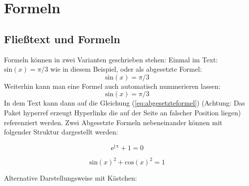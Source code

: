 
\chapter{Formeln}

\section{Fließtext und Formeln}

\label{eq:formelnnummeriert}Formeln können in zwei Varianten geschrieben
stehen: Einmal im Text: $\mathrm{sin}(x)=\pi/3$ wie in diesem Beispiel,
oder als abgesetzte Formel: 
\[
\mathrm{sin}(x)=\pi/3
\]
Weiterhin kann man eine Formel auch automatisch nummerieren lassen:
\begin{equation}
\mathrm{sin}(x)=\pi/3\label{eq:abgesetzteformel}
\end{equation}
In dem Text kann dann auf die Gleichung (\ref{eq:abgesetzteformel})
(Achtung: Das Paket hyperref erzeugt Hyperlinks die auf der Seite
an falscher Position liegen) referenziert werden. Zwei Abgesetzte
Formeln nebeneinander können mit folgender Struktur dargestellt werden:

\begin{minipage}[t]{0.39\textwidth}%
\begin{equation}
\mathrm{e}^{\mathrm{j\,\pi}}+1=0\label{eq:allekonstentenineinergleichung}
\end{equation}
%
\end{minipage} %
\begin{minipage}[t]{0.59\textwidth}%
\begin{equation}
\mathrm{sin}(x)^{2}+\mathrm{cos}(x)^{2}=1\label{eq:trigonometrischerpythagora}
\end{equation}
%
\end{minipage} 

Alternative Darstellungsweise mit Kästchen: 

%

